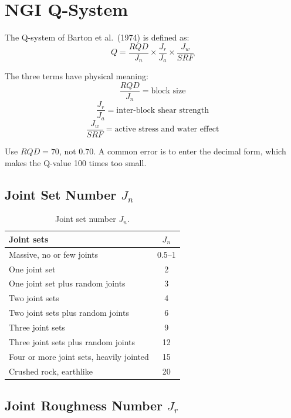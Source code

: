 \documentclass[a4paper,12pt]{article}
\begin{document}
\section{NGI Q-System}

The Q-system of Barton et al.\ (1974) is defined as:
\[
Q =
\frac{RQD}{J_n}
\times
\frac{J_r}{J_a}
\times
\frac{J_w}{SRF}
\]

The three terms have physical meaning:
\[
\frac{RQD}{J_n} = \text{block size}
\]
\[
\frac{J_r}{J_a} = \text{inter-block shear strength}
\]
\[
\frac{J_w}{SRF} = \text{active stress and water effect}
\]

\begin{notebox}
Use \(RQD=70\), not \(0.70\). A common error is to enter the decimal form, which
makes the Q-value 100 times too small.
\end{notebox}

\subsection{Joint Set Number \(J_n\)}

\begin{table}[H]
\centering
\small
\begin{tabularx}{0.85\textwidth}{Y c}
\toprule
\textbf{Joint sets} & \textbf{\(J_n\)} \\
\midrule
Massive, no or few joints & 0.5--1 \\
One joint set & 2 \\
One joint set plus random joints & 3 \\
Two joint sets & 4 \\
Two joint sets plus random joints & 6 \\
Three joint sets & 9 \\
Three joint sets plus random joints & 12 \\
Four or more joint sets, heavily jointed & 15 \\
Crushed rock, earthlike & 20 \\
\bottomrule
\end{tabularx}
\caption{Joint set number \(J_n\).}
\label{tab:jn}
\end{table}

\subsection{Joint Roughness Number \(J_r\)}
\end{document}
